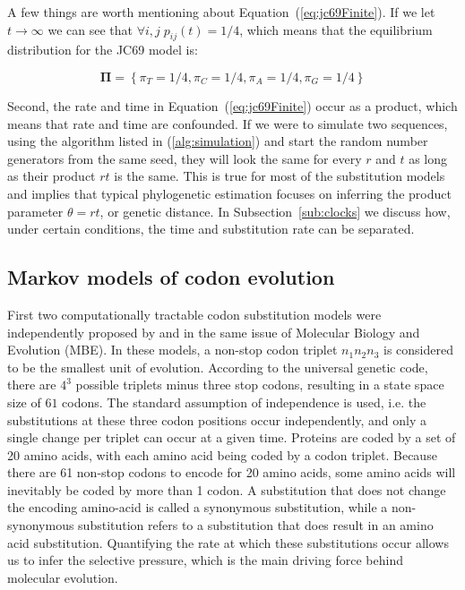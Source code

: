 \noindent
A few things are worth mentioning about Equation~(\ref{eq:jc69Finite}).
If we let $t\rightarrow \infty$ we can see that $\forall i,j\; p_{ij}(t)=1/4$, which means that the equilibrium distribution for the JC69 model is: 

\begin{equation}
\mathbf{\Pi}=\left\{ \pi_{T}=1/4,\pi_{C}=1/4,\pi_{A}=1/4,\pi_{G}=1/4\right\}
\label{eq:jc69Steady}
\end{equation}

\noindent
Second, the rate and time in Equation~(\ref{eq:jc69Finite}) occur as a product, which means that rate and time are confounded.
If we were to simulate two sequences, using the algorithm listed in (\ref{alg:simulation}) and start the random number generators from the same seed, they will look the same for every $r$ and $t$ as long as their product $rt$ is the same.
This is true for most of the substitution models and implies that typical phylogenetic estimation focuses on inferring the product parameter $\theta=rt$, or genetic distance.
In Subsection~\ref{sub:clocks} we discuss how, under certain conditions, the time and substitution rate can be separated.

\subsection{Markov models of codon evolution\label{sub:codon}}

First two computationally tractable codon substitution models were independently proposed by \cite{Muse1994} and \cite{Goldman1994} in the same issue of Molecular Biology and Evolution (MBE).
In these models, a non-stop codon triplet $n_{1}n_{2}n_{3}$ is considered to be the smallest unit of evolution.
According to the universal genetic code, there are $4^3$ possible triplets minus three stop codons, resulting in a state space size of $61$ codons.
The standard assumption of independence is used, i.e. the substitutions at these three codon positions occur independently, and only a single change per triplet can occur at a given time. 
Proteins are coded by a set of 20 amino acids, with each amino acid being coded by a codon triplet. 
Because there are 61 non-stop codons to encode for 20 amino acids, some amino acids will inevitably be coded by more than 1 codon.
A substitution that does not change the encoding amino-acid is called a synonymous substitution, while a non-synonymous substitution refers to a substitution that does result in an amino acid substitution.
Quantifying the rate at which these substitutions occur allows us to infer the selective pressure, which is the main driving force behind molecular evolution.

